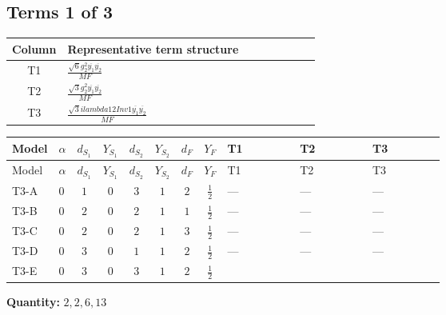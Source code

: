 \documentclass[8pt]{article}
\begin{document}
\begin{landscape}
\subsection*{Terms 1 of 3}
\begin{center}
\begin{tabular}{@{}c >{\raggedright\arraybackslash}p{0.82\linewidth}@{}}
\toprule
Column & Representative term structure \\
\midrule
T1 & \(\displaystyle \frac{\sqrt{6} g_{2}^{2} \overline{y_{1}} \overline{y_{2}}}{MF}\) \\
\midrule
T2 & \(\displaystyle \frac{\sqrt{3} g_{2}^{2} \overline{y_{1}} \overline{y_{2}}}{MF}\) \\
\midrule
T3 & \(\displaystyle \frac{\sqrt{3} i lambda12Inv1 \overline{y_{1}} \overline{y_{2}}}{MF}\) \\
\midrule
\bottomrule
\end{tabular}
\end{center}
\smallskip
\tiny
\begin{longtable}{@{}llcccccc >{\raggedright\arraybackslash}p{0.21\linewidth} >{\raggedright\arraybackslash}p{0.21\linewidth} >{\raggedright\arraybackslash}p{0.21\linewidth}@{}}
\toprule
Model & $\alpha$ & $d_{S_1}$ & $Y_{S_1}$ & $d_{S_2}$ & $Y_{S_2}$ & $d_F$ & $Y_F$ & T1 & T2 & T3 \\
\midrule
\endfirsthead
\toprule
Model & $\alpha$ & $d_{S_1}$ & $Y_{S_1}$ & $d_{S_2}$ & $Y_{S_2}$ & $d_F$ & $Y_F$ & T1 & T2 & T3 \\
\midrule
\endhead
T3-A & $0$ & $1$ & $0$ & $3$ & $1$ & $2$ & $\frac{1}{2}$ & --- & --- & --- \\
\midrule
T3-B & $0$ & $2$ & $0$ & $2$ & $1$ & $1$ & $\frac{1}{2}$ & --- & --- & --- \\
\midrule
T3-C & $0$ & $2$ & $0$ & $2$ & $1$ & $3$ & $\frac{1}{2}$ & --- & --- & --- \\
\midrule
T3-D & $0$ & $3$ & $0$ & $1$ & $1$ & $2$ & $\frac{1}{2}$ & --- & --- & --- \\
\midrule
T3-E & $0$ & $3$ & $0$ & $3$ & $1$ & $2$ & $\frac{1}{2}$ & \scriptsize\adjustbox{max width=\linewidth}{$\begin{gathered} \frac{\sqrt{6} g_{2}^{2} \overline{y_{1}} \overline{y_{2}}}{3 MF}\end{gathered}$} & \scriptsize\adjustbox{max width=\linewidth}{$\begin{gathered} \frac{\sqrt{3} g_{2}^{2} \overline{y_{1}} \overline{y_{2}}}{6 MF}\end{gathered}$} & \scriptsize\adjustbox{max width=\linewidth}{$\begin{gathered} - \frac{\sqrt{3} i lambda12Inv1 \overline{y_{1}} \overline{y_{2}}}{6 MF}\end{gathered}$} \\
\midrule
\bottomrule
\end{longtable}
\clearpage
\noindent\textbf{Quantity: }$\mathrm{2,2,6,13}$\par\smallskip

\end{landscape}
\end{document}
